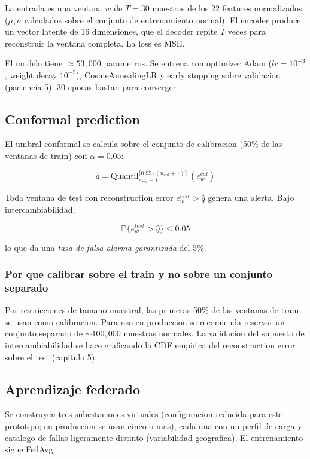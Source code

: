 La entrada es una ventana $w$ de $T=30$ muestras de los 22 features
normalizados ($\mu, \sigma$ calculados sobre el conjunto de
entrenamiento normal). El encoder produce un vector latente de 16
dimensiones, que el decoder repite $T$ veces para reconstruir la
ventana completa. La loss es MSE.

El modelo tiene $\approx 53{,}000$ parametros. Se entrena con
optimizer Adam ($lr=10^{-3}$, weight decay $10^{-5}$),
CosineAnnealingLR y early stopping sobre validacion (paciencia 5).
30 epocas bastan para converger.

\subsection{Conformal prediction}

El umbral conformal se calcula sobre el conjunto de calibracion
(50\% de las ventanas de train) con $\alpha = 0.05$:

\[
\hat{q} = \text{Quantil}_{n_{cal}+1}^{\lceil 0.95 \cdot (n_{cal}+1) \rceil}\, (e_w^{cal})
\]

Toda ventana de test con reconstruction error $e_w^{test} > \hat{q}$
genera una alerta. Bajo intercambiabilidad,

\[
\mathbb{P}\{e_w^{test} > \hat{q}\} \le 0.05
\]

lo que da una \emph{tasa de falsa alarma garantizada} del 5\%.

\subsubsection{Por que calibrar sobre el train y no sobre un conjunto separado}

Por restricciones de tamano muestral, las primeras 50\% de las
ventanas de train se usan como calibracion. Para uso en produccion
se recomienda reservar un conjunto separado de $\sim 100{,}000$
muestras normales. La validacion del supuesto de intercambiabilidad
se hace graficando la CDF empirica del reconstruction error sobre el
test (capitulo 5).

\subsection{Aprendizaje federado}

Se construyen tres subestaciones virtuales (configuracion reducida para
este prototipo; en produccion se usan cinco o mas), cada una con un perfil de
carga y catalogo de fallas ligeramente distinto (variabilidad
geografica). El entrenamiento sigue FedAvg:

